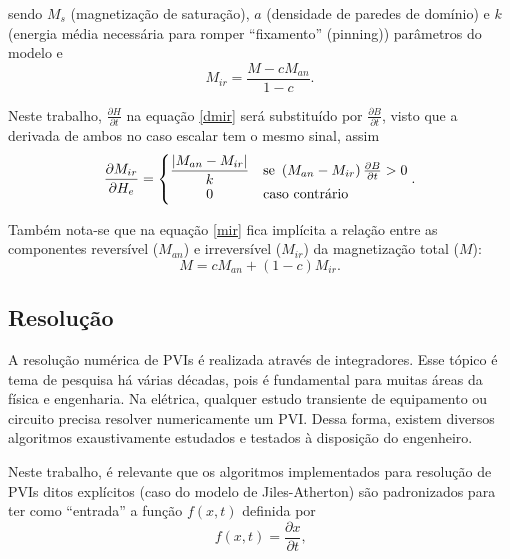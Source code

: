 \documentclass{homeworg}
\begin{document}
sendo $M_s$ (magnetização de saturação), $a$ (densidade de paredes de domínio) e $k$ (energia média necessária para romper ``fixamento'' (pinning)) parâmetros do modelo e
\begin{equation} \label{mir}
  M_{ir} = \frac{M - c M_{an}}{1-c} \text{.}
\end{equation}

\hspace{1cm} Neste trabalho, $\frac{\partial H}{\partial t}$ na equação \ref{dmir} será substituído por $\frac{\partial B}{\partial t}$, visto que a derivada de ambos no caso escalar tem o mesmo sinal, assim
\begin{equation}
  \frac{\partial M_{ir}}{\partial H_e} = \begin{cases}
    \displaystyle \frac{\lvert M_{an} - M_{ir} \rvert}{k} & \text{se } \left(M_{an} - M_{ir}\right) \frac{\partial B}{\partial t} > 0 \\
    \displaystyle\hfil 0 & \text{caso contrário}
  \end{cases} \text{.}
\end{equation}

\hspace{1cm} Também nota-se que na equação \ref{mir} fica implícita a relação entre as componentes reversível ($M_{an}$) e irreversível ($M_{ir}$) da magnetização total ($M$):
\begin{equation}
  M = c M_{an} + (1-c) M_{ir}\text{.}
\end{equation}

\subsection{Resolução}

\hspace{1cm} A resolução numérica de PVIs é realizada através de integradores. Esse tópico é tema de pesquisa há várias décadas, pois é fundamental para muitas áreas da física e engenharia. Na elétrica, qualquer estudo transiente de equipamento ou circuito precisa resolver numericamente um PVI. Dessa forma, existem diversos algoritmos exaustivamente estudados e testados à disposição do engenheiro.

\hspace{1cm} Neste trabalho, é relevante que os algoritmos implementados para resolução de PVIs ditos explícitos (caso do modelo de Jiles-Atherton) são padronizados para ter como ``entrada'' a função $f(x, t)$ definida por
\begin{equation} \label{pvi}
  f(x, t) = \frac{\partial x}{\partial t} \text{,}
\end{equation}
\end{document}
